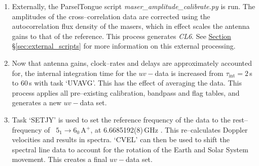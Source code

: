 \begin{enumerate}
            \item Externally, the ParselTongue script \textit{maser\_amplitude\_calibrate.py} is run. The amplitudes of the cross--correlation data are corrected using the autocorrelation flux density of the masers, which in effect scales the antenna gains to that of the reference. This process generates \textit{CL6}. See \hyperref[sec:external_scripts]{Section \S\ref*{sec:external_scripts}} for more information on this external processing.          
            \item Now that antenna gains, clock--rates and delays are approximately accounted for, the internal integration time for the $uv-$data is increased from $\tau_\text{int}=2$\,s to $60$\,s with task `UVAVG'. This has the effect of averaging the data. This process applies all pre--existing calibration, bandpass and flag tables, and generates a new $uv-$data set.          
            \item Task `SETJY' is used to set the reference frequency of the data to the rest--frequency of \choh\, $5_1\rightarrow6_0$\,A$^+$, at 6.6685192(8)\,GHz \citep{Muller2004}. This re--calculates Doppler velocities and results in spectra. `CVEL' can then be used to shift the spectral line data to account for the rotation of the Earth and Solar System movement. This creates a final $uv-$data set.               
        \end{enumerate}
